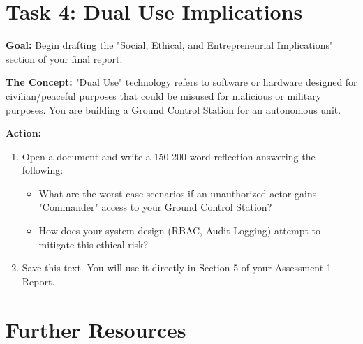 \documentclass[a4paper,12pt]{article}
\begin{document}

\section*{Task 4: Dual Use Implications}

\textbf{Goal:} Begin drafting the "Social, Ethical, and Entrepreneurial Implications" section of your final report.

\textbf{The Concept:} "Dual Use" technology refers to software or hardware designed for civilian/peaceful purposes that could be misused for malicious or military purposes. You are building a Ground Control Station for an autonomous unit.

\vspace{0.3cm}
\textbf{Action:}
\begin{enumerate}
    \item Open a document and write a 150-200 word reflection answering the following:
    \begin{itemize}
        \item What are the worst-case scenarios if an unauthorized actor gains "Commander" access to your Ground Control Station?
        \item How does your system design (RBAC, Audit Logging) attempt to mitigate this ethical risk?
    \end{itemize}
    \item Save this text. You will use it directly in Section 5 of your Assessment 1 Report.
\end{enumerate}


\section*{Further Resources}
\end{document}
